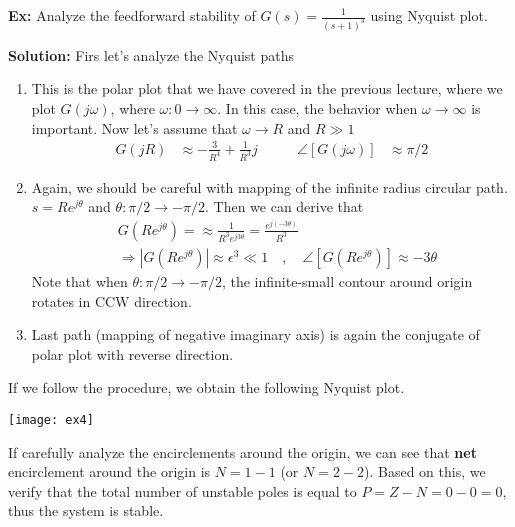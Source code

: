 \documentclass[twoside]{article}
\begin{document}
\textbf{Ex:} Analyze the feedforward stability of $G(s) =
\frac{1}{(s+1)^3}$ using Nyquist plot. 

\textbf{Solution:} Firs let's analyze the Nyquist paths
%
\begin{enumerate}
  \item This is the polar plot that we have covered in the previous
    lecture, where we plot $G(j \omega)$, where $\omega : 0 \to
    \infty$. In this case, the behavior when $\omega \to \infty$ is
    important. Now let's assume that $\omega \to R$ and $R \gg 1$
  \begin{align*}
   G(j R) &\approx -\frac{3}{R^4} + \frac{1}{R^3} j
    \quad & \quad 
    \angle [ G(j \omega) ] &\approx \pi / 2
   \end{align*}
%
  \item Again, we should be careful with mapping of  the infinite radius
    circular path. $s = R e^{j \theta}$ and $\theta : \pi/2 \to -\pi/2$.  Then 
   we can derive that  
   \begin{align*}
     & G \left( R e^{j \theta} \right) = \approx \frac{1}{R^3 e^{j
       3 \theta}} = \frac{e^{j (-3 \theta)}}{R^3}
       \\
    &\Rightarrow | G \left( R e^{j \theta} \right) | \approx
      \epsilon^3 \ll 1
   \quad , \quad \angle [ G \left( R e^{j \theta} \right) ] \approx -3
      \theta
   \end{align*}
   Note that when $\theta : \pi/2 \to -\pi/2$, the infinite-small 
   contour around origin rotates in CCW direction. 
   \item Last path (mapping of negative imaginary axis) is again
   the conjugate of polar plot with reverse direction. 
\end{enumerate}

If we follow the procedure, we obtain the following Nyquist plot. 

\vspace{6 pt}

  \begin{minipage}[h]{1\linewidth}
    \begin{center}
      \texttt{[image: ex4]}
    \end{center}
  \end{minipage}

\vspace{6 pt}

If carefully analyze the encirclements around the origin, 
we can see that \textbf{net} encirclement around the origin is 
$N = 1 - 1$ (or $N = 2 - 2$). Based on this, we verify that   
the total number of unstable poles is equal to
$P = Z - N = 0 - 0 = 0$, thus the system is stable. 
\end{document}
